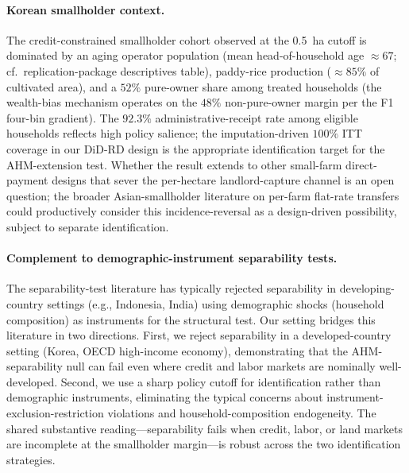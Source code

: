 \documentclass[12pt, a4paper]{article}
\begin{document}
\paragraph{Korean smallholder context.} The credit-constrained smallholder cohort observed at the 0.5~ha cutoff is dominated by an aging operator population (mean head-of-household age $\approx 67$; cf.\ replication-package descriptives table), paddy-rice production ($\approx 85\%$ of cultivated area), and a $52\%$ pure-owner share among treated households (the wealth-bias mechanism operates on the $48\%$ non-pure-owner margin per the F1 four-bin gradient). The $92.3\%$ administrative-receipt rate among eligible households reflects high policy salience; the imputation-driven $100\%$ ITT coverage in our DiD-RD design is the appropriate identification target for the AHM-extension test. Whether the result extends to other small-farm direct-payment designs that sever the per-hectare landlord-capture channel is an open question; the broader Asian-smallholder literature on per-farm flat-rate transfers could productively consider this incidence-reversal as a design-driven possibility, subject to separate identification.

\paragraph{Complement to demographic-instrument separability tests.} The separability-test literature \citep{Benjamin1992_separation, LaFaveThomas2016_markets} has typically rejected separability in developing-country settings (e.g., Indonesia, India) using demographic shocks (household composition) as instruments for the structural test. Our setting bridges this literature in two directions. First, we reject separability in a developed-country setting (Korea, OECD high-income economy), demonstrating that the AHM-separability null can fail even where credit and labor markets are nominally well-developed. Second, we use a sharp policy cutoff for identification rather than demographic instruments, eliminating the typical concerns about instrument-exclusion-restriction violations and household-composition endogeneity. The shared substantive reading---separability fails when credit, labor, or land markets are incomplete at the smallholder margin---is robust across the two identification strategies.
\end{document}
